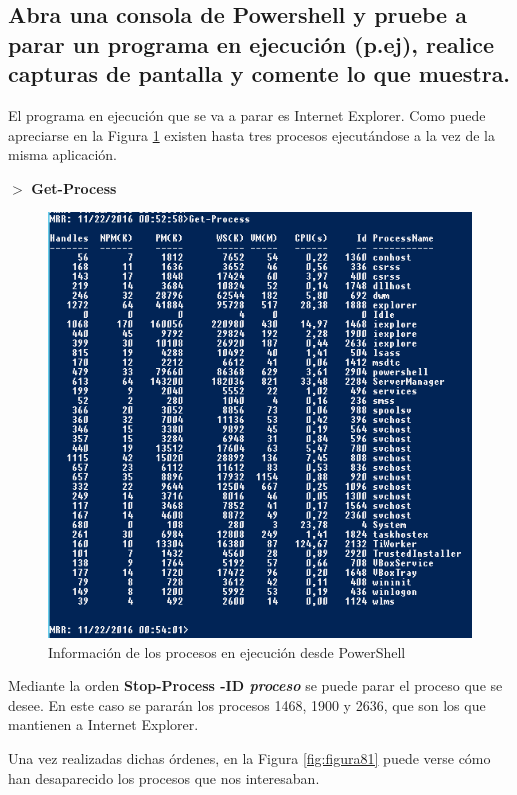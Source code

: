 \subsection{Abra una consola de Powershell y pruebe a parar un
programa en ejecución (p.ej), realice capturas de pantalla y comente
lo que muestra.}

El programa en ejecución que se va a parar es Internet Explorer. Como puede
apreciarse en la Figura \ref{fig:figura80} existen hasta tres procesos ejecutándose a la vez de la misma aplicación.

$ > $ \textbf{Get-Process}

\begin{figure}[H] %
	\centering
	\includegraphics[scale=0.9]{figuras/figura80.png} 
	\caption{Información de los procesos en ejecución desde PowerShell}
	\label{fig:figura80}
\end{figure}

Mediante la orden \textbf{Stop-Process -ID \textit{proceso}} se puede parar el proceso que se desee. En este caso se pararán los procesos 1468, 1900 y 2636, que son los que mantienen a Internet Explorer.

\newpage

Una vez realizadas dichas órdenes, en la Figura \ref{fig:figura81} puede verse cómo han desaparecido los procesos que nos interesaban.

